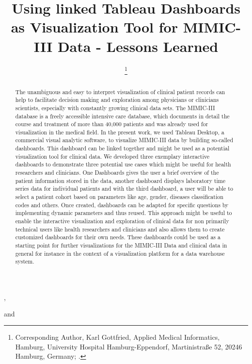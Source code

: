 \documentclass[aac,crcready]{iosart2x}
\begin{document}
\begin{frontmatter}

{\centering \title{Using linked Tableau Dashboards as Visualization Tool for MIMIC-III Data - Lessons Learned
}}


\author[A]{ %
\thanks{Corresponding Author, Karl Gottfried, Applied Medical Informatics, Hamburg, University Hospital Hamburg-Eppendorf, Martinistraße 52, 20246 Hamburg, Germany;  .}},
\author[A]{ }
and
\author[A]{ }
\address[A]{Applied Medical Informatics, , Germany, ,
}


\begin{abstract}
%
The unambiguous and easy to interpret visualization of clinical patient records can help to facilitate decision making and exploration among physicians or clinicians scientists, especially with constantly growing clinical data sets. The MIMIC-III database is a freely accessible intensive care database, which documents in detail the course and treatment of more than 40,000 patients and was already used for visualization in the medical field. In the present work, we used Tableau Desktop, a commercial visual analytic software, to visualize MIMIC-III data by building so-called dashboards. This dashboard can be linked together and might be used as a potential visualization tool for clinical data. We developed three exemplary interactive dashboards to demonstrate three potential use cases which might be useful for health researchers and clinicians. One Dashboards gives the user a brief overview of the patient information stored in the data, another dashboard displays laboratory time series data for individual patients and with the third dashboard, a user will be able to select a patient cohort based on parameters like age, gender, diseases classification codes and others. Once created, dashboards can be adapted for specific questions by implementing dynamic parameters and thus reused. This approach might be useful to enable the interactive visualization and exploration of clinical data for non primarily technical users like health researchers and clinicians and also allows them to create customized dashboards for their own needs. These dashboards could be used as a starting point for further visualizations for the MIMIC-III Data and clinical data in general for instance in the context of a visualization platform for a data warehouse system. 
\end{abstract}


\end{frontmatter}
\end{document}
